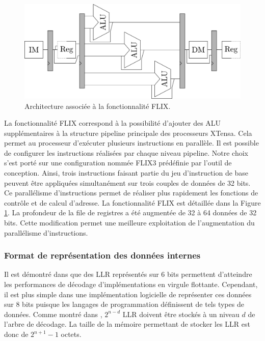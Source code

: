 \begin{figure}
\centering
\includegraphics[width=\textwidth]{main/ch3_fig/flix}
\caption{Architecture associée à la fonctionnalité FLIX.}
\label{fig:flix}
\end{figure}

La fonctionnalité FLIX correspond à la possibilité d'ajouter des ALU supplémentaires à la structure pipeline principale des processeurs XTensa. Cela permet au processeur d'exécuter plusieurs instructions en parallèle. Il est possible de configurer les instructions réalisées par chaque niveau pipeline. Notre choix s'est porté sur une configuration nommée FLIX3 prédéfinie par l'outil de conception. Ainsi, trois instructions faisant partie du jeu d'instruction de base peuvent être appliquées simultanément sur trois couples de données de 32 bits. Ce parallélisme d'instructions permet de réaliser plus rapidement les fonctions de contrôle et de calcul d'adresse. La fonctionnalité FLIX est détaillée dans la Figure \ref{fig:flix}.
La profondeur de la file de registres a été augmentée de 32 à 64 données de 32 bits. Cette modification permet une meilleure exploitation de l'augmentation du parallélisme d'instructions.

\subsubsection{Format de représentation des données internes}
Il est démontré dans \cite{sarkis_fast_2014} que des LLR représentés sur 6 bits permettent d'atteindre les performances de décodage d'implémentations en virgule flottante. Cependant, il est plus simple dans une implémentation logicielle de représenter ces données sur 8 bits puisque les langages de programmation définissent de tels types de données. Comme montré dans \cite{leroux_hardware_2011}, $2^{n-d}$ LLR doivent être stockés à un niveau $d$ de l'arbre de décodage. La taille de la mémoire permettant de stocker les LLR est donc de $2^{n+1}-1$ octets.

